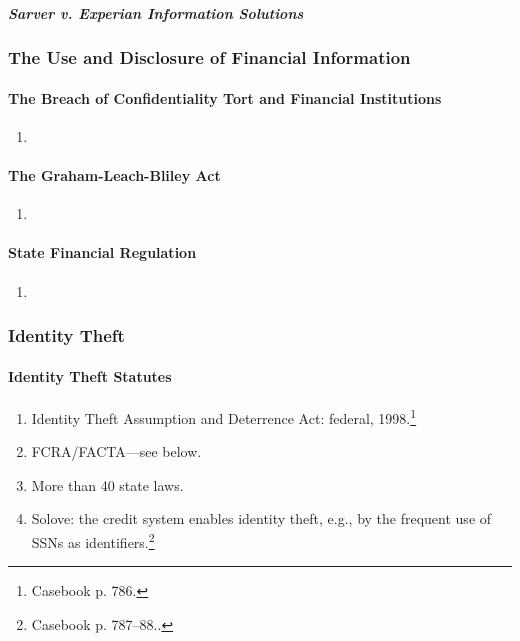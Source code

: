 \paragraph{\emph{Sarver v. Experian Information Solutions}}


\subsubsection{The Use and Disclosure of Financial Information}

\paragraph{The Breach of Confidentiality Tort and Financial Institutions} %

\begin{enumerate}
    \item 
\end{enumerate}

\paragraph{The Graham-Leach-Bliley Act} %

\begin{enumerate}
    \item 
\end{enumerate}

\paragraph{State Financial Regulation} %

\begin{enumerate}
    \item 
\end{enumerate}

\subsubsection{Identity Theft}

\paragraph{Identity Theft Statutes}

\begin{enumerate}
    \item Identity Theft Assumption and Deterrence Act: federal, 
    1998.\footnote{Casebook p. 786.}
    \item FCRA/FACTA---see below.
    \item More than 40 state laws.
    \item Solove: the credit system enables identity theft, e.g., by the 
    frequent use of SSNs as identifiers.\footnote{Casebook p. 787--88..}
\end{enumerate}

